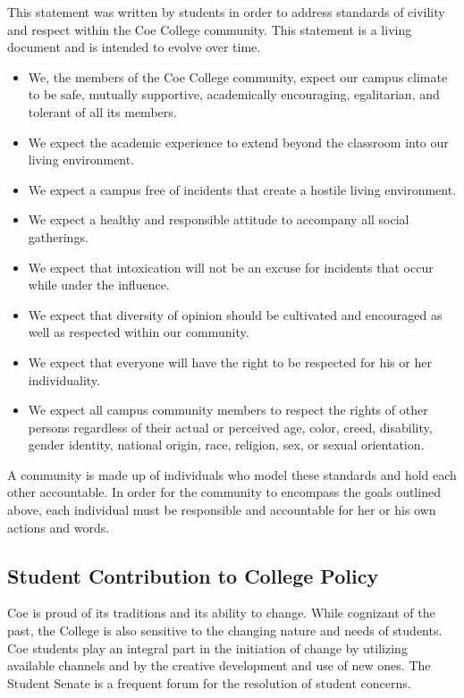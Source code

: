 \documentclass[
  letterpaper,
]{scrbook}
\providecommand{\tightlist}{%
  \setlength{\itemsep}{0pt}\setlength{\parskip}{0pt}}
\begin{document}
This statement was written by students in order to address standards of
civility and respect within the Coe College community. This statement is
a living document and is intended to evolve over time.

\begin{itemize}
\tightlist
\item
  We, the members of the Coe College community, expect our campus
  climate to be safe, mutually supportive, academically encouraging,
  egalitarian, and tolerant of all its members.
\item
  We expect the academic experience to extend beyond the classroom into
  our living environment.
\item
  We expect a campus free of incidents that create a hostile living
  environment.
\item
  We expect a healthy and responsible attitude to accompany all social
  gatherings.
\item
  We expect that intoxication will not be an excuse for incidents that
  occur while under the influence.
\item
  We expect that diversity of opinion should be cultivated and
  encouraged as well as respected within our community.
\item
  We expect that everyone will have the right to be respected for his or
  her individuality.
\item
  We expect all campus community members to respect the rights of other
  persons regardless of their actual or perceived age, color, creed,
  disability, gender identity, national origin, race, religion, sex, or
  sexual orientation.
\end{itemize}

A community is made up of individuals who model these standards and hold
each other accountable. In order for the community to encompass the
goals outlined above, each individual must be responsible and
accountable for her or his own actions and words.

\subsection{Student Contribution to College
Policy}\label{student-contribution-to-college-policy}

Coe is proud of its traditions and its ability to change. While
cognizant of the past, the College is also sensitive to the changing
nature and needs of students. Coe students play an integral part in the
initiation of change by utilizing available channels and by the creative
development and use of new ones. The Student Senate is a frequent forum
for the resolution of student concerns.
\end{document}
